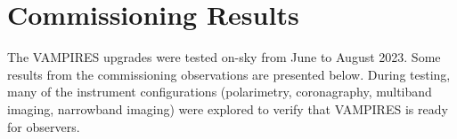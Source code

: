 \section{Commissioning Results}\label{sec:firstlight}

The VAMPIRES upgrades were tested on-sky from June to August 2023. Some results from the commissioning observations are presented below. During testing, many of the instrument configurations (polarimetry, coronagraphy, multiband imaging, narrowband imaging) were explored to verify that VAMPIRES is ready for observers.




